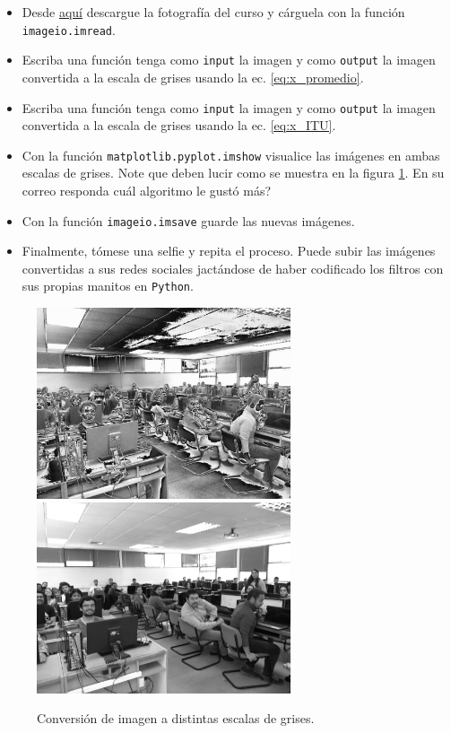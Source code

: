 \documentclass[11pt]{exam}
\newcommand{\figref}[1]{\ref{#1}}
\begin{document}
\begin{itemize}
\item Desde \href{https://github.com/PythonUdeC/CPC19/blob/master/images/IMG_20190109_144618.jpg}{aqu\'i} descargue la fotograf\'ia del curso y c\'arguela con la funci\'on \texttt{imageio.imread}.
\item Escriba una funci\'on tenga como \texttt{input} la imagen y como \texttt{output} la imagen convertida a la escala de grises usando la ec. \eqref{eq:x_promedio}.
\item Escriba una funci\'on tenga como \texttt{input} la imagen y como \texttt{output} la imagen convertida a la escala de grises usando la ec. \eqref{eq:x_ITU}.
\item Con la funci\'on \texttt{matplotlib.pyplot.imshow} visualice las im\'agenes en ambas escalas de grises. Note que deben lucir como se muestra en la figura \figref{fig:escalas_grises}. En su correo responda \textquestiondown cu\'al algoritmo le gust\'o m\'as?
\item Con la funci\'on \texttt{imageio.imsave} guarde las nuevas im\'agenes.
\item Finalmente, t\'omese una selfie y repita el proceso. Puede subir las im\'agenes convertidas a sus redes sociales jact\'andose de haber codificado los filtros con sus propias manitos en \texttt{Python}.
\end{itemize}
\begin{figure}[H]
 \centering
 \includegraphics[width=7.5cm]{../images/curso_gris01.jpg}
 \includegraphics[width=7.5cm]{../images/curso_gris02.jpg}
 \caption{Conversi\'on de imagen a distintas escalas de grises.}
 \label{fig:escalas_grises}
\end{figure} 
\end{document}
